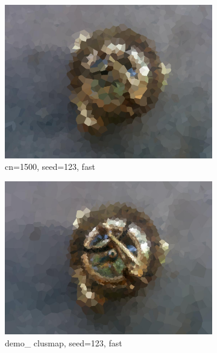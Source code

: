 \documentclass[15pt]{article}
\begin{document}
\begin{figure}
\centering
\begin{subfigure}[b]{0.48\linewidth}
\includegraphics[width=\linewidth]{auto1500_f_s123.jpg}
\caption{cn=1500, seed=123, fast}
\end{subfigure}
\begin{subfigure}[b]{0.48\linewidth}
\includegraphics[width=\linewidth]{clusmap_f_s123.jpg}
\caption{demo\_ clusmap, seed=123, fast}
\end{subfigure}
\begin{subfigure}[b]{0.48\linewidth}

\end{subfigure}
\end{figure}
\end{document}
